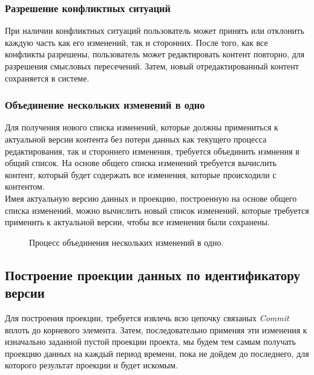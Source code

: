 \documentclass[a4paper,14pt]{extreport} %
\begin{document}
\subsubsection{Разрешение конфликтных ситуаций}

При наличии конфликтных ситуаций пользователь может принять или отклонить каждую часть как его изменений, так и сторонних.
После того, как все конфликты разрешены, пользователь может редактировать контент повторно, для разрешения смысловых пересечений. Затем, новый отредактированный контент сохраняется в системе.

\newpage
\subsubsection{Объединение нескольких изменений в одно}

Для получения нового списка изменений, которые должны примениться к актуальной версии контента без потери данных как текущего процесса редактирования, так и стороннего изменения, требуется объединить измнения в общий список. На основе общего списка изменений требуется вычислить контент, который будет содержать все изменения, которые происходили с контентом. \\
Имея актуальную версию данных и проекцию, построенную на основе общего списка изменений, можно вычислить новый список изменений, которые требуется применить к актуальной версии, чтобы все изменения были сохранены.

\begin{figure}[H]
\caption{Процесс объединения нескольких изменений в одно.}
\label{check-conflicts-process}
\end{figure}

\newpage
\subsection{Построение проекции данных по идентификатору версии}
Для построения проекции, требуется извлечь всю цепочку связаных \textit{Commit} вплоть до корневого элемента. Затем, последовательно применяя эти изменения к изначально заданной пустой проекции проекта, мы будем тем самым получать проекцию данных на каждый период времени, пока не дойдем до последнего, для которого результат проекции и будет искомым.
\end{document}
